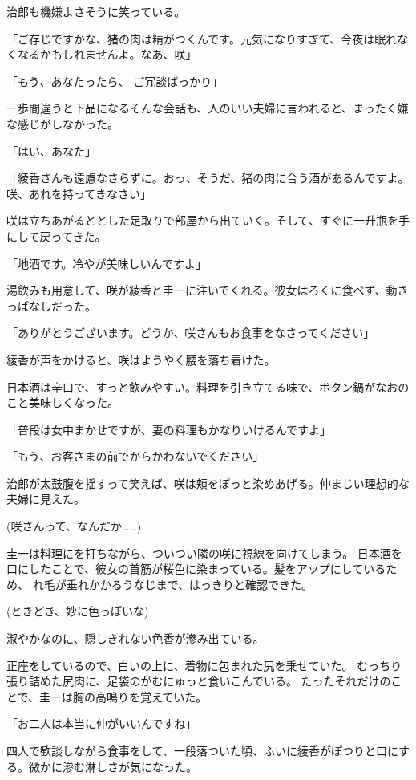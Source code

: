 ﻿\documentclass[
    book,tate,
    line_length=30zw,
    jafontsize=12pt,
    paper=b5j,
    landscape,
    ]{jlreq}
\begin{document}
治郎も機嫌よさそうに笑っている。

「ご存じですかな、猪の肉は精がつくんです。元気になりすぎて、今夜は眠れなくなるかもしれませんよ。なあ、咲」

「もう、あなたったら、 ご冗談ばっかり」

一歩間違うと下品になるそんな会話も、人のいい夫婦に言われると、まったく嫌な感じがしなかった。

「はい、あなた」

「綾香さんも遠慮なさらずに。おっ、そうだ、猪の肉に合う酒があるんですよ。 咲、あれを持ってきなさい」

咲は立ちあがるととした足取りで部屋から出ていく。そして、すぐに一升瓶を手にして戻ってきた。

「地酒です。冷やが美味しいんですよ」

湯飲みも用意して、咲が綾香と圭一に注いでくれる。彼女はろくに食べず、動きっぱなしだった。

「ありがとうございます。どうか、咲さんもお食事をなさってください」

綾香が声をかけると、咲はようやく腰を落ち着けた。

日本酒は辛口で、すっと飲みやすい。料理を引き立てる味で、ボタン鍋がなおのこと美味しくなった。

「普段は女中まかせですが、妻の料理もかなりいけるんですよ」

「もう、お客さまの前でからかわないでください」

治郎が太鼓腹を揺すって笑えば、咲は頬をぽっと染めあげる。仲まじい理想的な夫婦に見えた。

(咲さんって、なんだか……)

圭一は料理にを打ちながら、ついつい隣の咲に視線を向けてしまう。
日本酒を口にしたことで、彼女の首筋が桜色に染まっている。髪をアップにしているため、
れ毛が垂れかかるうなじまで、はっきりと確認できた。

(ときどき、妙に色っぽいな)

淑やかなのに、隠しきれない色香が滲み出ている。

正座をしているので、白いの上に、着物に包まれた尻を乗せていた。
むっちり張り詰めた尻肉に、足袋のがむにゅっと食いこんでいる。
たったそれだけのことで、圭一は胸の高鳴りを覚えていた。

「お二人は本当に仲がいいんですね」

四人で歓談しながら食事をして、一段落ついた頃、ふいに綾香がぽつりと口にする。微かに滲む淋しさが気になった。
\end{document}
